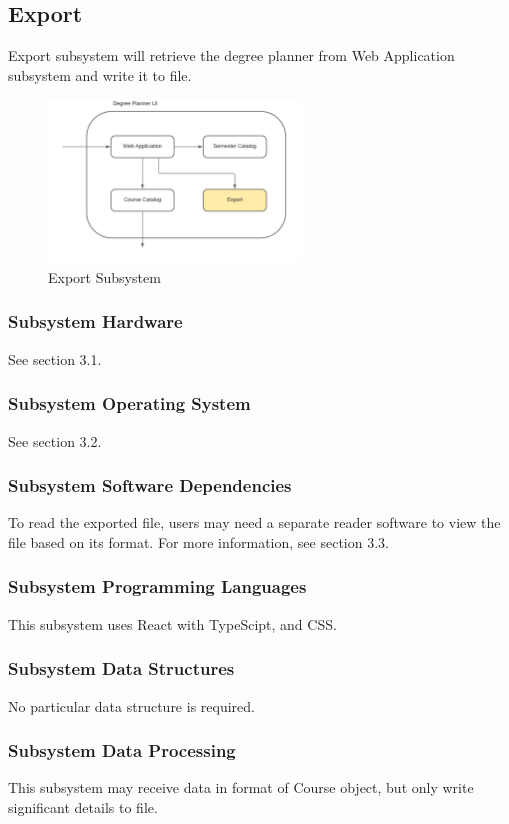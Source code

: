 \vspace{100cm}

\subsection{Export}
Export subsystem will retrieve the degree planner from Web Application subsystem and write it to file.

\begin{figure}[h!]
	\centering
 	\includegraphics[width=0.60\textwidth]{images/Export} %
 \caption{Export Subsystem} %
\end{figure}

\subsubsection{Subsystem Hardware}
See section 3.1.

\subsubsection{Subsystem Operating System}
See section 3.2.

\subsubsection{Subsystem Software Dependencies}
To read the exported file, users may need a separate reader software to view the file based on its format. For more information, see section 3.3.

\subsubsection{Subsystem Programming Languages}
This subsystem uses React with TypeScipt, and CSS.

\subsubsection{Subsystem Data Structures}
No particular data structure is required.

\subsubsection{Subsystem Data Processing}
This subsystem may receive data in format of Course object, but only write significant details to file.




